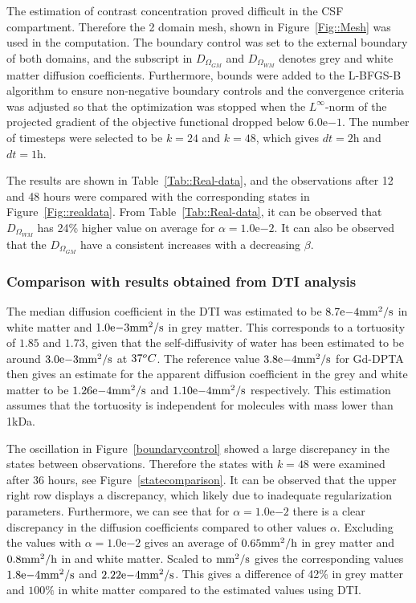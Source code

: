 \documentclass[12pt,a4paper]{article}
\begin{document}
The estimation of contrast concentration proved difficult in the CSF compartment. Therefore the 2 domain mesh, shown in Figure~\ref{Fig::Mesh} was used in the computation. The boundary control was set to the external boundary of both domains, and the subscript in $D_{\Omega_{GM}}$ and $D_{\Omega_{WM}}$ denotes grey and white matter diffusion coefficients. Furthermore, bounds were added to the L-BFGS-B algorithm to ensure non-negative boundary controls and the convergence criteria was adjusted so that the optimization was stopped when the $L^\infty$-norm of the projected gradient of the objective functional dropped below $6.0\mathrm{e}{-1}$. The number of timesteps were selected to be $k=24$ and $k=48$, which gives $dt = 2 \mathrm{h}$ and $dt = 1 \mathrm{h}$.   

The results are shown in Table~\ref{Tab::Real-data}, and the observations after 12 and 48 hours were compared with the corresponding states in Figure~\ref{Fig::realdata}. From Table~\ref{Tab::Real-data}, it can be observed that $D_{\Omega_{WM}}$ has 24\% higher value on average for $\alpha =1.0\mathrm{e}{-2}$. It can also be observed that the $D_{\Omega_{GM}}$ have a consistent increases with a decreasing $\beta$.

\subsubsection{Comparison with results obtained from DTI analysis}
The median diffusion coefficient in the DTI was estimated to be $8.7\mathrm{e}{-4} \mathrm{mm\sp{2}/s}$ in white matter and $1.0\mathrm{e}{-3} \mathrm{mm\sp{2}/s}$ in grey matter. This corresponds to a tortuosity of $1.85$ and $1.73$, given that the self-diffusivity of water has been estimated to be around $3.0\mathrm{e}{-3}\mathrm{mm\sp{2}/s}$ at $37\sp{o}C$. The reference value $3.8\mathrm{e}{-4} \mathrm{mm\sp{2}/s}$ for Gd-DPTA then gives an estimate for the apparent diffusion coefficient in the grey and white matter to  be $ 1.26\mathrm{e}{-4}\mathrm{mm\sp{2}/s}$ and $1.10\mathrm{e}{-4} \mathrm{mm\sp{2}/s}$ respectively. This estimation assumes that the tortuosity is independent for molecules with mass lower than 1kDa. 

The oscillation in Figure~\ref{boundarycontrol} showed a large discrepancy in the states between observations. Therefore the states with $k=48$ were examined after 36 hours, see Figure~\ref{statecomparison}. It can be observed that the upper right row displays a discrepancy, which likely due to inadequate regularization parameters. Furthermore, we can see that for $\alpha=1.0\mathrm{e}{-2}$ there is a clear discrepancy in the diffusion coefficients compared to other values $\alpha$. Excluding the values with $\alpha=1.0\mathrm{e}{-2}$ gives an average of $ 0.65 \mathrm{mm\sp{2}/h}$ in grey matter and $ 0.8 \mathrm{mm\sp{2}/h}$ in and white matter. Scaled to $\mathrm{mm\sp{2}/s}$ gives the corresponding values $1.8\mathrm{e}{-4}\mathrm{mm\sp{2}/s}$ and $2.22\mathrm{e}{-4} \mathrm{mm\sp{2}/s}$. This gives a difference of 42\% in grey matter and $ 100 \%$ in white matter compared to the estimated values using DTI.
\end{document}

